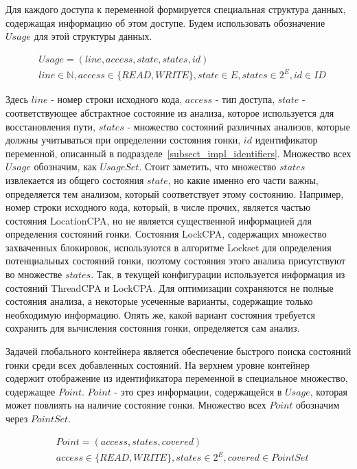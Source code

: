 Для каждого доступа к переменной формируется специальная структура данных, содержащая информацию об этом доступе. 
Будем использовать обозначение $Usage$ для этой структуры данных.

\begin{align}
& Usage = (line, access, state, states, id) \nonumber \\ 
& line \in \mathbb{N}, access \in \{READ, WRITE\}, state \in E, states \in 2^E, id \in ID \nonumber
\end{align}

Здесь $line$ - номер строки исходного кода, $access$ - тип доступа, $state$ - соответствующее абстрактное состояние из анализа, которое используется для восстановления пути, $states$ - множество состояний различных анализов, которые должны учитываться при определении состояния гонки, $id$ идентификатор переменной, описанный в подразделе~\ref{subsect_impl_identifiers}.
Множество всех $Usage$ обозначим, как $UsageSet$. 
Стоит заметить, что множество $states$ извлекается из общего состояния $state$, но какие именно его части важны, определяется тем анализом, который соответствует этому состоянию.
Например, номер строки исходного кода, который, в числе прочих, является частью состояния LocationCPA, но не является существенной информацией для определения состояний гонки. 
Состояния LockCPA, содержащих множество захваченных блокировок, используются в алгоритме Lockset для определения потенциальных состояний гонки, поэтому состояния этого анализа присутствуют во множестве $states$. 
Так, в текущей конфигурации используется информация из состояний ThreadCPA и LockCPA. 
Для оптимизации сохраняются не полные состояния анализа, а некоторые усеченные варианты, содержащие только необходимую информацию.
Опять же, какой вариант состояния требуется сохранить для вычисления состояния гонки, определяется сам анализ.

Задачей глобального контейнера является обеспечение быстрого поиска состояний гонки среди всех добавленных состояний. 
На верхнем уровне контейнер содержит отображение из идентификатора переменной в специальное множество, содержащее $Point$.
$Point$ - это срез информации, содержащейся в $Usage$, которая может повлиять на наличие состояние гонки.
Множество всех $Point$ обозначим через $PointSet$.

\begin{align}
& Point = (access, states, covered) \nonumber \\ 
& access \in \{READ, WRITE\}, states \in 2^E, covered \in PointSet \nonumber
\end{align}

